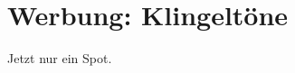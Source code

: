 \newpage
\section{Werbung: Klingeltöne}
\label{sec:klingelton}
\charaktere{-}
\setting{-}
\sound{-}
\licht{-}
\requisiten{-}

\begin{verseplay}[7em]
 Jetzt nur ein Spot.
\end{verseplay}

